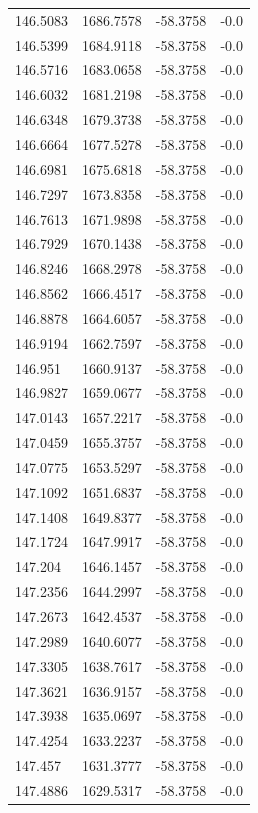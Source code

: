 \begin{table}[H]
\begin{tabular}{llll}
146.5083 & 1686.7578 & -58.3758 & -0.0 \\
146.5399 & 1684.9118 & -58.3758 & -0.0 \\
146.5716 & 1683.0658 & -58.3758 & -0.0 \\
146.6032 & 1681.2198 & -58.3758 & -0.0 \\
146.6348 & 1679.3738 & -58.3758 & -0.0 \\
146.6664 & 1677.5278 & -58.3758 & -0.0 \\
146.6981 & 1675.6818 & -58.3758 & -0.0 \\
146.7297 & 1673.8358 & -58.3758 & -0.0 \\
146.7613 & 1671.9898 & -58.3758 & -0.0 \\
146.7929 & 1670.1438 & -58.3758 & -0.0 \\
146.8246 & 1668.2978 & -58.3758 & -0.0 \\
146.8562 & 1666.4517 & -58.3758 & -0.0 \\
146.8878 & 1664.6057 & -58.3758 & -0.0 \\
146.9194 & 1662.7597 & -58.3758 & -0.0 \\
146.951 & 1660.9137 & -58.3758 & -0.0 \\
146.9827 & 1659.0677 & -58.3758 & -0.0 \\
147.0143 & 1657.2217 & -58.3758 & -0.0 \\
147.0459 & 1655.3757 & -58.3758 & -0.0 \\
147.0775 & 1653.5297 & -58.3758 & -0.0 \\
147.1092 & 1651.6837 & -58.3758 & -0.0 \\
147.1408 & 1649.8377 & -58.3758 & -0.0 \\
147.1724 & 1647.9917 & -58.3758 & -0.0 \\
147.204 & 1646.1457 & -58.3758 & -0.0 \\
147.2356 & 1644.2997 & -58.3758 & -0.0 \\
147.2673 & 1642.4537 & -58.3758 & -0.0 \\
147.2989 & 1640.6077 & -58.3758 & -0.0 \\
147.3305 & 1638.7617 & -58.3758 & -0.0 \\
147.3621 & 1636.9157 & -58.3758 & -0.0 \\
147.3938 & 1635.0697 & -58.3758 & -0.0 \\
147.4254 & 1633.2237 & -58.3758 & -0.0 \\
147.457 & 1631.3777 & -58.3758 & -0.0 \\
147.4886 & 1629.5317 & -58.3758 & -0.0 \\

\end{tabular}
\end{table}
